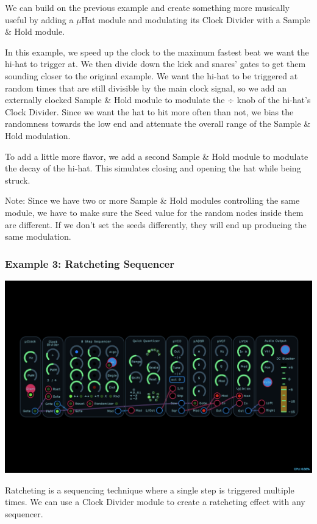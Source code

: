 \documentclass[11pt]{book}
\begin{document}
\begin{multicols*}{2}
We can build on the previous example and create something more musically useful by adding a $\mu$Hat module and modulating its Clock Divider with a Sample \& Hold module.

In this example, we speed up the clock to the maximum fastest beat we want the hi-hat to trigger at. We then divide down the kick and snares' gates to get them sounding closer to the original example. We want the hi-hat to be triggered at random times that are still divisible by the main clock signal, so we add an externally clocked Sample \& Hold module to modulate the $\div$ knob of the hi-hat's Clock Divider. Since we want the hat to hit more often than not, we bias the randomness towards the low end and attenuate the overall range of the Sample \& Hold modulation.

To add a little more flavor, we add a second Sample \& Hold module to modulate the decay of the hi-hat. This simulates closing and opening the hat while being struck.

Note: Since we have two or more Sample \& Hold modules controlling the same module, we have to make sure the Seed value for the random nodes inside them are different. If we don't set the seeds differently, they will end up producing the same modulation.

\subsubsection*{Example 3: Ratcheting Sequencer}

\begin{center}
\includegraphics[width=0.95\linewidth]{clock-divider-fig9.png}
\end{center}

Ratcheting is a sequencing technique where a single step is triggered multiple times. We can use a Clock Divider module to create a ratcheting effect with any sequencer.


\end{multicols*}
\end{document}
